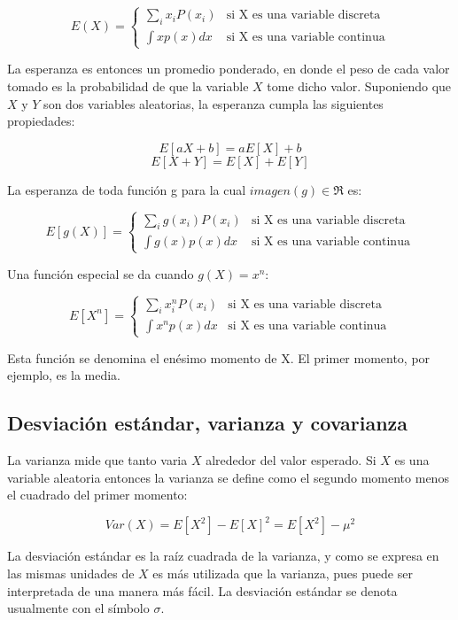 \documentclass[a4paper, 11pt, oneside]{report}
\begin{document}
	\[ E(X) = \left\{ \begin{array}{ll}
		\sum_{i}{x_iP(x_i)}   & \mbox{si X es una variable discreta} \\
		\int {xp(x)dx} & \mbox{si X es una variable continua}
	\end{array} \right. \]

La esperanza es entonces un promedio ponderado, en donde el peso de cada valor tomado es la probabilidad de que la variable $X$ tome dicho valor. Suponiendo que $X$ y $Y$ son dos variables aleatorias, la esperanza cumpla las siguientes propiedades:

	\[E[aX + b] = aE[X] + b\]
	\[E[X + Y] = E[X] + E[Y]\]

La esperanza de toda función g para la cual $imagen(g) \in \Re$ es:

	\[ E[g(X)] = \left\{ \begin{array}{ll}
		\sum_{i}{g(x_i)P(x_i)}   & \mbox{si X es una variable discreta} \\
		\int {g(x)p(x)dx} & \mbox{si X es una variable continua}
	\end{array} \right. \]

Una función especial se da cuando $g(X) = x^n$:

	\[ E[X^n] = \left\{ \begin{array}{ll}
		\sum_{i}{x_i^nP(x_i)}   & \mbox{si X es una variable discreta} \\
		\int {x^np(x)dx} & \mbox{si X es una variable continua}
	\end{array} \right. \]

Esta función se denomina el enésimo momento de X. El primer momento, por ejemplo, es la media.

\subsection{Desviación estándar, varianza y covarianza}

La varianza mide que tanto varia $X$ alrededor del valor esperado. Si $X$ es una variable aleatoria entonces la varianza se define como el segundo momento menos el cuadrado del primer momento:

	\[Var(X) = E[X^2] - E[X]^2 = E[X^2] - \mu^2\]

La desviación estándar es la raíz cuadrada de la varianza, y como se expresa en las mismas unidades de $X$ es más utilizada que la varianza, pues puede ser interpretada de una manera más fácil. La desviación estándar se denota usualmente con el símbolo $\sigma$.
\end{document}
